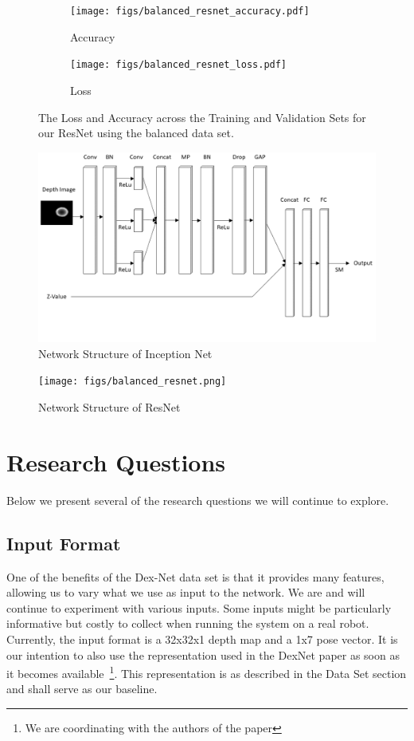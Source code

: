 \documentclass[letterpaper, 10 pt, conference]{../ieeeconf}
\begin{document}
\begin{figure}[t!]
    \begin{subfigure}[t]{0.49\textwidth}
        \texttt{[image: figs/balanced\_resnet\_accuracy.pdf]}
        \caption{Accuracy} \label{fig:accuracy}
        \end{subfigure}
    \begin{subfigure}[t]{0.49\textwidth}
        \texttt{[image: figs/balanced\_resnet\_loss.pdf]}
        \caption{Loss} \label{fig:loss}
    \end{subfigure}
\caption{The Loss and Accuracy across the Training and Validation Sets for our ResNet using the balanced data set.} \label{fig:resnet_results}
\end{figure}


\begin{figure}[t!]
    \centering
        \includegraphics[width=0.7\columnwidth]{figs/inception_net.png}
    \caption{Network Structure of Inception Net} \label{fig:inception_net}
\end{figure}

\begin{figure}[t!]
    \centering
        \texttt{[image: figs/balanced\_resnet.png]}
    \caption{Network Structure of ResNet} \label{fig:res_net}
\end{figure}

\section{Research Questions}
\label{sec:questions}
Below we present several of the research questions we will continue to explore. 

\subsection{Input Format}
One of the benefits of the Dex-Net data set is that it provides many features, allowing us to vary what we use as input to the network. 
We are and will continue to experiment with various inputs. 
Some inputs might be particularly informative but costly to collect when running the system on a real robot. 
Currently, the input format is a 32x32x1 depth map and a 1x7 pose vector. 
It is our intention to also use the representation used in the DexNet paper as soon as it becomes available~\footnote{We are coordinating with the authors of the paper}.
This representation is as described in the Data Set section and shall serve as our baseline. 
\end{document}

